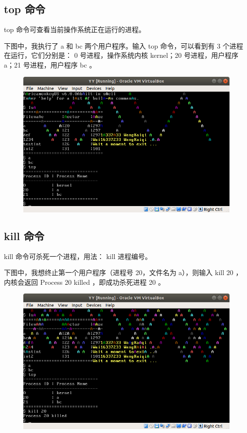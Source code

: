 \documentclass{article}
\begin{document}
\subsection{top 命令}

top 命令可查看当前操作系统正在运行的进程。

下图中，我执行了 a 和 bc 两个用户程序。输入 top 命令，可以看到有 3 个进程在运行，它们分别是： 0 号进程，操作系统内核 kernel；20 号进程，用户程序 a；21 号进程，用户程序 bc 。

\newpage

\begin{figure}[!hbp]
	\centering
	\includegraphics[scale=0.5]{pics/6.png}
\end{figure}


\subsection{kill 命令}

kill 命令可杀死一个进程，用法： kill 进程编号。

下图中，我想终止第一个用户程序（进程号 20，文件名为 a），则输入 kill 20 ，内核会返回 Process 20 killed ，即成功杀死进程 20 。

\begin{figure}[!hbp]
	\centering
	\includegraphics[scale=0.5]{pics/7.png}
\end{figure}
\end{document}
